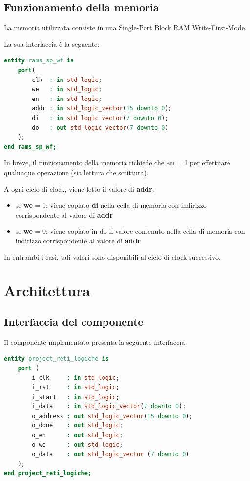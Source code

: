 \documentclass[a4paper, 12pt]{article}
\begin{document}
\newpage
\subsection{Funzionamento della memoria}
La memoria utilizzata consiste in una Single-Port Block RAM Write-First-Mode.

\bigskip
La sua interfaccia è la seguente:
\begin{lstlisting}[language=VHDL]
entity rams_sp_wf is
    port(
        clk  : in std_logic;
        we   : in std_logic;
        en   : in std_logic;
        addr : in std_logic_vector(15 downto 0);
        di   : in std_logic_vector(7 downto 0);
        do   : out std_logic_vector(7 downto 0)
    );
end rams_sp_wf;
\end{lstlisting}

\bigskip
In breve, il funzionamento della memoria richiede che \textbf{en} = 1 per effettuare qualunque operazione (sia lettura che scrittura). 

\bigskip
A ogni ciclo di clock, viene letto il valore di \textbf{addr}:
\begin{itemize}
    \item se \textbf{we} = 1: viene copiato \textbf{di} nella cella di memoria con indirizzo corrispondente al valore di \textbf{addr}
    \item se \textbf{we} = 0: viene copiato in do il valore contenuto nella cella di memoria con indirizzo corrispondente al valore di \textbf{addr}
\end{itemize}

\bigskip
In entrambi i casi, tali valori sono disponibili al ciclo di clock successivo.


\newpage
\section{Architettura}
\subsection{Interfaccia del componente}
Il componente implementato presenta la seguente interfaccia:

\begin{lstlisting}[language=VHDL]
entity project_reti_logiche is
    port (
        i_clk     : in std_logic;
        i_rst     : in std_logic;
        i_start   : in std_logic;
        i_data    : in std_logic_vector(7 downto 0);
        o_address : out std_logic_vector(15 downto 0);
        o_done    : out std_logic;
        o_en      : out std_logic;
        o_we      : out std_logic;
        o_data    : out std_logic_vector (7 downto 0)
    );
end project_reti_logiche;
\end{lstlisting}
\end{document}
